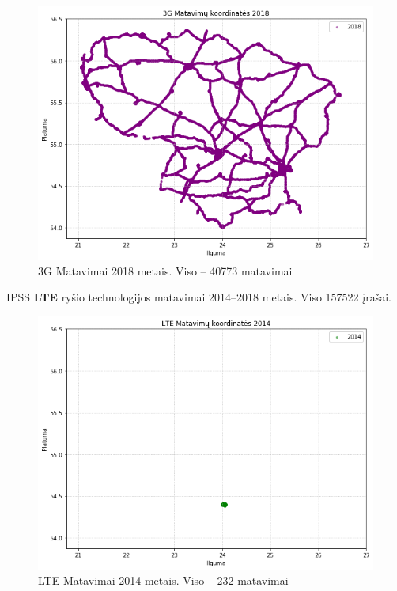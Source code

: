 \documentclass{VUMIFPSbakalaurinis}
\begin{document}
\begin{figure}[H]
	\centering
	\includegraphics[scale=0.33]{img/3G-5}
	\caption{3G Matavimai 2018 metais. Viso – 40773 matavimai}
	\label{img:3G-5}
\end{figure}
IPSS \textbf{LTE} ryšio technologijos matavimai 2014–2018 metais. Viso 157522 įrašai.
\begin{figure}[H]
	\centering
	\includegraphics[scale=0.33]{img/LTE-1}
	\caption{LTE Matavimai 2014 metais. Viso – 232 matavimai}
	\label{img:LTE-1}
\end{figure}
\end{document}
